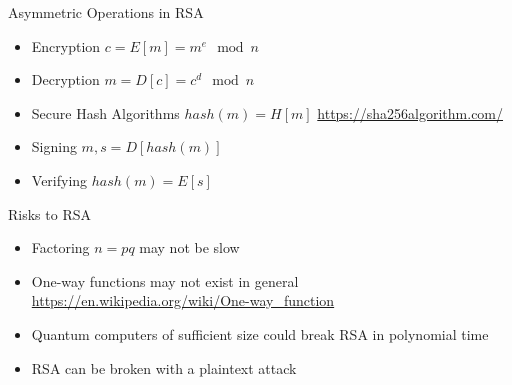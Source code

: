 
\begin{frame}{Asymmetric Operations in RSA}
    \begin{itemize}
        \item Encryption $c = E[m] = m^e \mod n$
        \item Decryption $m = D[c] = c^d \mod n$
        \item Secure Hash Algorithms  $hash(m) = H[m]$ \url{https://sha256algorithm.com/}
        \item Signing    $m, s= D[hash(m)]$
        \item Verifying  $hash(m) = E[s]$
    \end{itemize}
\end{frame}

\begin{frame}{Risks to RSA}
    \begin{itemize}
        \item Factoring $n=pq$ may not be slow
        \item One-way functions may not exist in general
              \url{https://en.wikipedia.org/wiki/One-way\_function}
        \item Quantum computers of sufficient size could break RSA in polynomial time
        \item RSA can be broken with a plaintext attack
    \end{itemize}
\end{frame}

